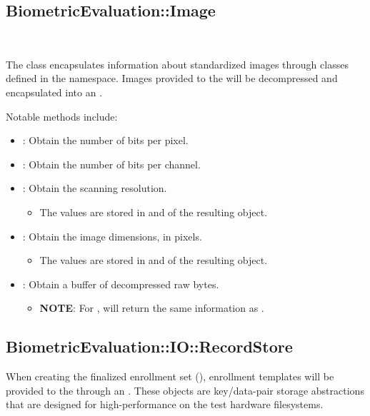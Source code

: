 \subsection{BiometricEvaluation::Image}

\large{}\\
\large{}

The  class encapsulates information about standardized images
through classes defined in the  namespace. Images provided to the
\implementation will be decompressed and encapsulated into an .

Notable methods include:
\begin{itemize}
	\item {}: Obtain the number of bits per pixel.
	\item {}: Obtain the number of bits per channel.
	\item {}: Obtain the scanning resolution.
		\begin{itemize}
			\item The values are stored in  and
			 of the resulting object.
		\end{itemize}
	\item {}: Obtain the image dimensions, in pixels.
		\begin{itemize}
			\item The values are stored in  and
			 of the resulting object.
		\end{itemize}
	\item {}: Obtain a buffer of decompressed raw bytes.
	\begin{itemize}
		\item \textbf{NOTE}: For , 
		will return the same information as .
	\end{itemize}
\end{itemize}

\subsection{BiometricEvaluation::IO::RecordStore}

\large{}

When creating the finalized enrollment set (),
enrollment templates will be provided to the \implementation through an
. These objects are key/data-pair storage abstractions
that are designed for high-performance on the test hardware filesystems.

